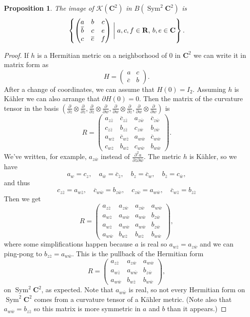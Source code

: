 \documentclass[10pt,a4paper]{amsart}
\newtheorem{prop}[theo]{Proposition}
\theoremstyle{definition}
\def\ov#1{\overline{#1}}
\newcommand{\kk}[1]{\mathbf{#1}}
\newcommand{\cc}[1]{\mathcal{#1}}
\DeclareMathOperator{\Sym}{Sym}
\begin{document}
\begin{prop}
The image of $\cc K(\kk C^2)$ in $B(\Sym^2 \kk C^2)$ is
$$
\left\{
\begin{pmatrix}
a & b & c
\\
\ov b & c & e
\\
c & \ov e & f
\end{pmatrix}
\biggm|
\text{$a, c, f \in \kk R$, $b, e \in \kk C$}
\right\}.
$$
\end{prop}


\begin{proof}
If $h$ is a Hermitian metric on a neighborhood of $0$ in $\kk C^2$
we can write it in matrix form as
$$
H = \begin{pmatrix}
a & c
\\
\ov c & b
\end{pmatrix}.
$$
After a change of coordinates, we can assume that $H(0) = I_2$.
Assuming $h$ is K\"ahler we can also arrange that $\partial H(0) = 0$.
Then the matrix of the curvature tensor in the basis
\def\tg#1#2{\frac{\partial}{\partial #1} \otimes \frac{\partial}{\partial #2}}
$(\tg zz, \tg zw, \tg wz, \tg ww)$
is
$$
R = \begin{pmatrix}
a_{z \ov z} & \ov c_{z \ov z} & a_{z \ov w} & \ov c_{z \ov w}
\\
c_{z \ov z} & b_{z \ov z} & c_{z \ov w} & b_{z \ov w}
\\
a_{w \ov z} & \ov c_{w \ov z} & a_{w \ov w} & \ov c_{w \ov w}
\\
c_{w \ov z} & b_{w \ov z} & c_{w \ov w} & b_{w \ov w}
\end{pmatrix}.
$$
We've written, for example, $a_{z \ov w}$ instead of $\frac{\partial^2 a}{\partial z \partial \ov w}$.
The metric $h$ is K\"ahler, so we have
$$
a_w = c_{z},
\quad
a_{\ov w} = \ov c_{\ov z},
\quad
b_z = \ov c_w,
\quad
b_{\ov z} = c_{\ov w},
$$
and thus
$$
c_{z \ov z} = a_{w \ov z},
\quad
\ov c_{w \ov w} = b_{z \ov w},
\quad
c_{z \ov w} = a_{w \ov w},
\quad
\ov c_{w \ov z} = b_{z \ov z}
$$
Then we get
$$
R = \begin{pmatrix}
a_{z \ov z} & a_{z \ov w} & a_{z \ov w} & a_{w \ov w}
\\
a_{w \ov z} & a_{w \ov w} & a_{w \ov w} & b_{z \ov w}
\\
a_{w \ov z} & a_{w \ov w} & a_{w \ov w} & b_{z \ov w}
\\
a_{w \ov w} & b_{w \ov z} & b_{w \ov z} & b_{w \ov w}
\end{pmatrix},
$$
where some simplifications happen because $a$ is real so $a_{w \ov z} =
a_{z \ov w}$ and we can ping-pong to $b_{z \ov z} = a_{w \ov w}$.
This is the pullback of the Hermitian form
$$
R = \begin{pmatrix}
a_{z \ov z} & a_{z \ov w} & a_{w \ov w}
\\
a_{w \ov z} & a_{w \ov w} & b_{z \ov w}
\\
a_{w \ov w} & b_{w \ov z} & b_{w \ov w}
\end{pmatrix},
$$
on $\Sym^2 \kk C^2$, as expected.
Note that $a_{w \ov w}$ is real, so not every Hermitian form on
$\Sym^2 \kk C^2$ comes from a curvature tensor of a K\"ahler metric.
(Note also that $a_{w \ov w} = b_{z \ov z}$ so this matrix is more symmetric in
$a$ and $b$ than it appears.)



\end{proof}
\end{document}
